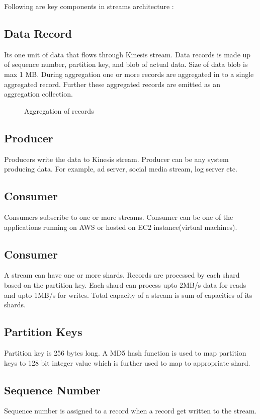 \documentclass[9pt,twocolumn,twoside]{../../styles/osajnl}
\begin{document}
Following are key components in streams architecture \cite{www-kinesis-arch} :

\subsection{Data Record}
Its one unit of data that flows through Kinesis stream. Data records is made up
of sequence number, partition key, and blob of actual data. Size of data blob is
max 1 MB. During aggregation one or more records are aggregated in to a single
aggregated record. Further these aggregated records are emitted as an
aggregation collection.

\begin{figure}[htbp]
\centering
{}
\caption{Aggregation of records}
\label{fig:false-color}
\end{figure}

\subsection{Producer}
Producers write the data to Kinesis stream. Producer can be any system producing
data. For example, ad server, social media stream, log server etc.

\subsection{Consumer}
Consumers subscribe to one or more streams.  Consumer can be one of the
applications  running on AWS or hosted on EC2 instance(virtual machines).
 
\subsection{Consumer}
A stream can have one or more shards. Records are processed by each shard based
on the partition key. Each shard can process upto 2MB/s data for reads and upto
1MB/s for writes. Total capacity of a stream is sum of capacities of its shards.

\subsection{Partition Keys} 
Partition key is 256 bytes long. A MD5 hash function is used to map partition
keys to 128 bit integer value which is further used to map to appropriate shard.

\subsection{Sequence Number}
Sequence number is assigned to a record when a record get written to the stream. 
\end{document}
